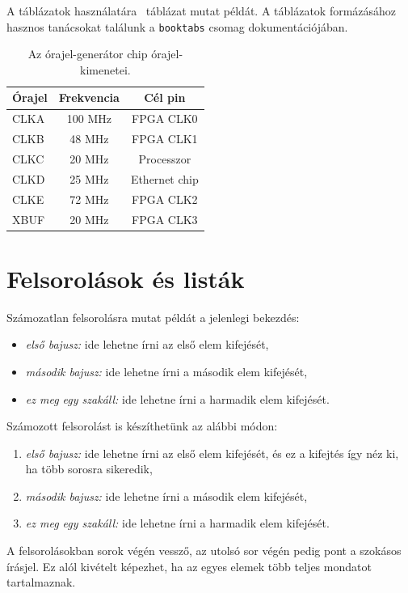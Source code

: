 A táblázatok használatára ~táblázat mutat példát. A táblázatok formázásához hasznos tanácsokat találunk a \verb+booktabs+ csomag dokumentációjában.

\begin{table}[!ht]
	\footnotesize
	\centering
	\begin{tabular}{ l c c }
		\toprule
		Órajel & Frekvencia & Cél pin \\
		\midrule
		CLKA & 100 MHz & FPGA CLK0\\
		CLKB & 48 MHz  & FPGA CLK1\\
		CLKC & 20 MHz  & Processzor\\
		CLKD & 25 MHz  & Ethernet chip \\
		CLKE & 72 MHz  & FPGA CLK2\\
		XBUF & 20 MHz  & FPGA CLK3\\
		\bottomrule
	\end{tabular}
	\caption{Az órajel-generátor chip órajel-kimenetei.}
	\label{tab:TabularExample}
\end{table}


\section{Felsorolások és listák}
Számozatlan felsorolásra mutat példát a jelenlegi bekezdés:
\begin{itemize}
	\item \emph{első bajusz:} ide lehetne írni az első elem kifejését,
	\item \emph{második bajusz:} ide lehetne írni a második elem kifejését,
	\item \emph{ez meg egy szakáll:} ide lehetne írni a harmadik elem kifejését.
\end{itemize}

Számozott felsorolást is készíthetünk az alábbi módon:
\begin{enumerate}
	\item \emph{első bajusz:} ide lehetne írni az első elem kifejését, és ez a kifejtés így néz ki, ha több sorosra sikeredik,
	\item \emph{második bajusz:} ide lehetne írni a második elem kifejését,
	\item \emph{ez meg egy szakáll:} ide lehetne írni a harmadik elem kifejését.
\end{enumerate}
A felsorolásokban sorok végén vessző, az utolsó sor végén pedig pont a szokásos írásjel. Ez alól kivételt képezhet, ha az egyes elemek több teljes mondatot tartalmaznak.

